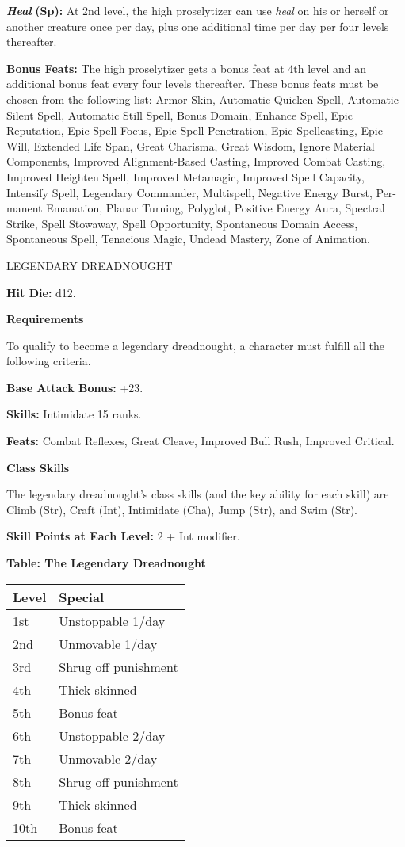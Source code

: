 \documentclass{article}
\begin{document}
\textit{\textbf{Heal }}\textbf{(Sp):} At 2nd level, the high proselytizer can use 
\textit{heal }on his or herself or another creature once per day, plus one additional 
time per day per four levels thereafter. 

\textbf{Bonus Feats:} The high proselytizer gets a bonus feat at 4th level and 
an additional bonus feat every four levels thereafter. These bonus feats must be 
chosen from the following list: Armor Skin, Automatic Quicken Spell, Automatic 
Silent Spell, Automatic Still Spell, Bonus Domain, Enhance Spell, Epic Reputation, 
Epic Spell Focus, Epic Spell Penetration, Epic Spellcasting, Epic Will, Extended 
Life Span, Great Charisma, Great Wisdom, Ignore Material Components, Improved Alignment-Based 
Casting, Improved Combat Casting, Improved Heighten Spell, Improved Metamagic, 
Improved Spell Capacity, Intensify Spell, Legendary Commander, Multispell, Negative 
Energy Burst, Per-manent Emanation, Planar Turning, Polyglot, Positive Energy Aura, 
Spectral Strike, Spell Stowaway, Spell Opportunity, Spontaneous Domain Access, 
Spontaneous Spell, Tenacious Magic, Undead Mastery, Zone of Animation.

\vspace{12pt}
{\LARGE{}LEGENDARY DREADNOUGHT }

\textbf{Hit Die:} d12. 

\textbf{Requirements}

To qualify to become a legendary dreadnought, a character must fulfill all the 
following criteria. 

\textbf{Base Attack Bonus:} +23. 

\textbf{Skills:} Intimidate 15 ranks. 

\textbf{Feats:} Combat Reflexes, Great Cleave, Improved Bull Rush, Improved Critical. 

\textbf{Class Skills}

The legendary dreadnought's class skills (and the key ability for each skill) are 
Climb (Str), Craft (Int), Intimidate (Cha), Jump (Str), and Swim (Str). 

\textbf{Skill Points at Each Level:} 2 + Int modifier. 

\vspace{12pt}
\textbf{Table: The Legendary Dreadnought }

\begin{tabular}{|>{\raggedright}p{27pt}|>{\raggedright}p{93pt}|}
\hline
L\textbf{evel} & S\textbf{pecial }\tabularnewline
\hline
1st & Unstoppable 1/day \tabularnewline
\hline
2nd & Unmovable 1/day \tabularnewline
\hline
3rd & Shrug off punishment \tabularnewline
\hline
4th & Thick skinned \tabularnewline
\hline
5th & Bonus feat \tabularnewline
\hline
6th & Unstoppable 2/day \tabularnewline
\hline
7th & Unmovable 2/day \tabularnewline
\hline
8th & Shrug off punishment \tabularnewline
\hline
9th & Thick skinned \tabularnewline
\hline
10th & Bonus feat \tabularnewline
\hline
\end{tabular}
\end{document}
